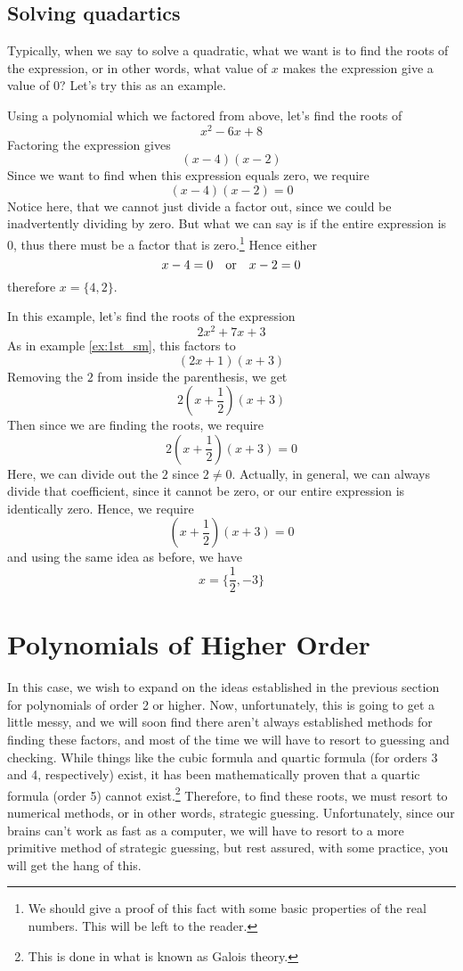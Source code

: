 \subsection{Solving quadartics}
Typically, when we say to solve a quadratic, what we want is to find the roots of the expression, or in other words, what value of $x$ makes the expression give a value of 0? Let's try this as an example.

\begin{ex}
	Using a polynomial which we factored from above, let's find the roots of
	$$x^2-6x+8$$
	Factoring the expression gives
	$$(x-4)(x-2)$$
	Since we want to find when this expression equals zero, we require
	$$(x-4)(x-2)=0$$
	Notice here, that we cannot just divide a factor out, since we could be inadvertently dividing by zero. 
	But what we can say is if the entire expression is 0, thus there must be a factor that is zero.\footnote{
	We should give a proof of this fact with some basic properties of the real numbers. This will be left to the reader.}
	Hence either
	$$x-4=0 \quad\text{or}\quad x-2=0$$
	therefore $x=\{4,2\}$.
\end{ex}

\begin{ex}
	In this example, let's find the roots of the expression 
	$$2x^2+7x+3$$
	As in example \eqref{ex:1st_sm}, this factors to
	$$(2x+1)(x+3)$$
	Removing the $2$ from inside the parenthesis, we get
	$$2(x+\frac{1}{2})(x+3)$$
	Then since we are finding the roots, we require
	$$2(x+\frac{1}{2})(x+3)=0$$
	Here, we can divide out the $2$ since $2\neq0$. Actually, in general, we can always divide that coefficient, 
	since it cannot be zero, or our entire expression is identically zero.
	Hence, we require
	$$(x+\frac{1}{2})(x+3)=0$$
	and using the same idea as before, we have
	$$x=\{\frac{1}{2},-3\}$$
\end{ex}


\section{Polynomials of Higher Order}
In this case, we wish to expand on the ideas established in the previous section for polynomials of order 2 or higher. 
Now, unfortunately, this is going to get a little messy, and we will soon find there aren't always established methods for finding these factors, and most of the time we will have to resort to guessing and checking. 
While things like the cubic formula and quartic formula (for orders 3 and 4, respectively) exist, it has been mathematically proven that a quartic formula (order 5) cannot exist.\footnote{This is done in what is known as Galois theory.}
Therefore, to find these roots, we must resort to numerical methods, or in other words, strategic guessing.
Unfortunately, since our brains can't work as fast as a computer, we will have to resort to a more primitive method of strategic guessing, but rest assured, with some practice, you will get the hang of this.

